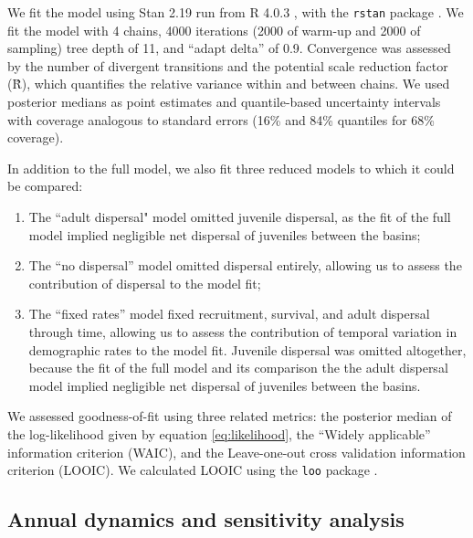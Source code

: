 \documentclass[11pt]{article}
\begin{document}
We fit the model using Stan 2.19 \citep{carpenter2017}
run from R 4.0.3 \citep{r2020}, with the \texttt{rstan} package \citep{Stan2018}.
We fit the model with 4 chains,
4000 iterations (2000 of warm-up and 2000 of sampling)
tree depth of 11, and ``adapt delta'' of 0.9.
Convergence was assessed by the number of divergent transitions 
and the potential scale reduction factor (\^{R}),
which quantifies the relative variance within and between chains. 
We used posterior medians as point estimates
and quantile-based uncertainty intervals
with coverage analogous to standard errors
(16\% and 84\% quantiles for 68\% coverage).

In addition to the full model, 
we also fit three reduced models to which it could be compared:
%
\begin{enumerate}[label=(\arabic*)]
\item
The ``adult dispersal" model omitted juvenile dispersal,
as the fit of the full model implied negligible net dispersal of juveniles between the basins;
%
\item
The ``no dispersal'' model omitted dispersal entirely,
allowing us to assess the contribution of dispersal to the model fit; 
%
\item
The ``fixed rates'' model fixed recruitment, survival, and adult dispersal through time,
allowing us to assess the contribution of temporal variation in demographic rates
to the model fit. Juvenile dispersal was omitted altogether, 
because the fit of the full model and its comparison the the adult dispersal model 
implied negligible net dispersal of juveniles between the basins.
\end{enumerate}
%
We assessed goodness-of-fit using three related metrics:
the posterior median of the log-likelihood given by equation \ref{eq:likelihood},
the ``Widely applicable'' information criterion (WAIC),
and the Leave-one-out cross validation information criterion (LOOIC).
We calculated LOOIC using the \texttt{loo} package \citep{vehtari2020}.





\subsection*{Annual dynamics and sensitivity analysis} 

\end{document}
